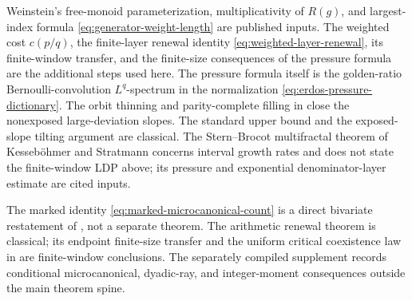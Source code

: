 \else
\begin{remark}
Weinstein's free-monoid parameterization, multiplicativity of \(R(g)\), and
largest-index formula \eqref{eq:generator-weight-length} are published
inputs.  The weighted cost \(c(p/q)\), the finite-layer renewal identity
\eqref{eq:weighted-layer-renewal}, its finite-window transfer, and the
finite-size consequences of the pressure formula are the additional steps
used here.  The pressure formula itself is the golden-ratio
Bernoulli-convolution \(L^q\)-spectrum in the normalization
\eqref{eq:erdos-pressure-dictionary}.  The orbit thinning and
parity-complete filling in  close the nonexposed
large-deviation slopes.  The standard upper bound and the exposed-slope
tilting argument are classical.  The Stern--Brocot multifractal theorem of
Kesseb\"ohmer and Stratmann
\cite{KessebohmerStratmann2004,KessebohmerStratmann2007} concerns interval
growth rates and does not state the finite-window LDP above; its pressure
and exponential denominator-layer estimate are cited inputs.

The marked identity \eqref{eq:marked-microcanonical-count} is a direct
bivariate restatement of , not a
separate theorem.  The arithmetic renewal theorem is classical; its
endpoint finite-size transfer and the uniform critical coexistence law in
 are finite-window conclusions.  The
separately compiled supplement records conditional microcanonical,
dyadic-ray, and integer-moment consequences outside the main theorem spine.
\end{remark}
\fi
